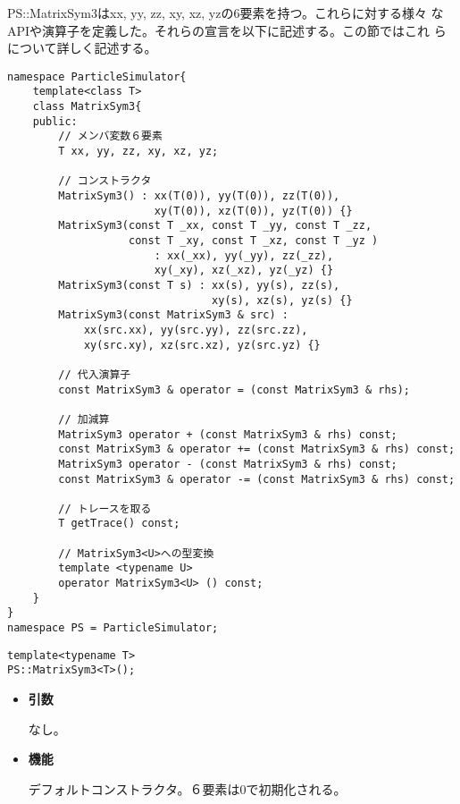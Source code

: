 PS::MatrixSym3はxx, yy, zz, xy, xz, yzの6要素を持つ。これらに対する様々
なAPIや演算子を定義した。それらの宣言を以下に記述する。この節ではこれ
らについて詳しく記述する。
\begin{lstlisting}[caption=MatrixSym3]
namespace ParticleSimulator{
    template<class T>
    class MatrixSym3{
    public:
        // メンバ変数６要素
        T xx, yy, zz, xy, xz, yz;

        // コンストラクタ
        MatrixSym3() : xx(T(0)), yy(T(0)), zz(T(0)),
                       xy(T(0)), xz(T(0)), yz(T(0)) {}
        MatrixSym3(const T _xx, const T _yy, const T _zz,
                   const T _xy, const T _xz, const T _yz )
                       : xx(_xx), yy(_yy), zz(_zz),
                       xy(_xy), xz(_xz), yz(_yz) {}
        MatrixSym3(const T s) : xx(s), yy(s), zz(s),
                                xy(s), xz(s), yz(s) {}
        MatrixSym3(const MatrixSym3 & src) :
            xx(src.xx), yy(src.yy), zz(src.zz),
            xy(src.xy), xz(src.xz), yz(src.yz) {}

        // 代入演算子
        const MatrixSym3 & operator = (const MatrixSym3 & rhs);

        // 加減算
        MatrixSym3 operator + (const MatrixSym3 & rhs) const;
        const MatrixSym3 & operator += (const MatrixSym3 & rhs) const;
        MatrixSym3 operator - (const MatrixSym3 & rhs) const;
        const MatrixSym3 & operator -= (const MatrixSym3 & rhs) const;

        // トレースを取る
        T getTrace() const;

        // MatrixSym3<U>への型変換
        template <typename U>
        operator MatrixSym3<U> () const;
    }
}
namespace PS = ParticleSimulator;
\end{lstlisting}


\begin{screen}
\begin{verbatim}
template<typename T>
PS::MatrixSym3<T>();
\end{verbatim}
\end{screen}

\begin{itemize}

\item{{\bf 引数}}

なし。

\item{{\bf 機能}}

デフォルトコンストラクタ。６要素は0で初期化される。

\end{itemize}

